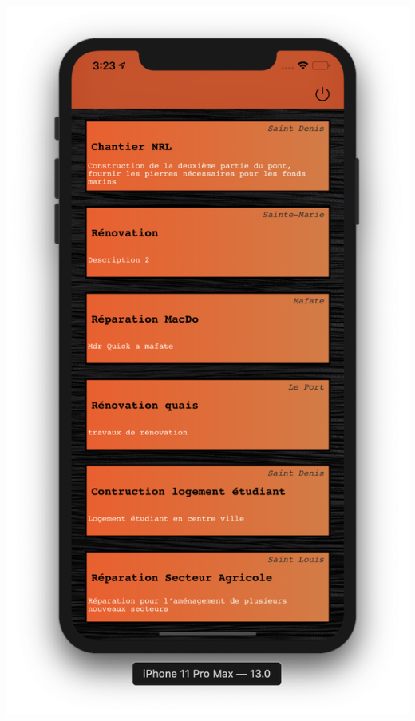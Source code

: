 \documentclass{article}
\begin{document}
\begin{center}
  \includegraphics[scale=0.2]{ListeMissionsIOS.png}

\end{center}
\end{document}
